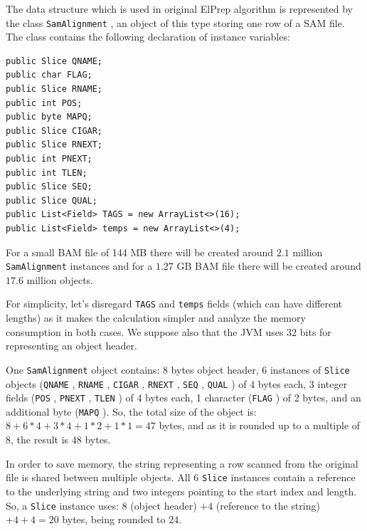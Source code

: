 \documentclass[a4paper,twoside]{article}
\begin{document}
The data structure which is used in original ElPrep algorithm is represented by the class {\texttt{SamAlignment} }, an object of this type storing one row of a SAM file.
The class contains the following declaration of instance variables:

\begin{small}
\begin{verbatim}
public Slice QNAME;
public char FLAG;
public Slice RNAME;
public int POS;
public byte MAPQ;
public Slice CIGAR;
public Slice RNEXT;
public int PNEXT;
public int TLEN;
public Slice SEQ;
public Slice QUAL;
public List<Field> TAGS = new ArrayList<>(16);
public List<Field> temps = new ArrayList<>(4);
\end{verbatim}
\end{small}

For a small BAM file of 144 MB there will be created around $2.1$ million {\texttt{SamAlignment} } instances and for a $1.27$ GB BAM file there will be created around $17.6$ million objects.

For simplicity, let's disregard {\texttt{TAGS} } and {\texttt{temps} } fields (which can have different lengths) as it makes the calculation simpler and analyze the memory consumption in both cases.
We suppose also that the JVM uses 32 bits for representing an object header.

One {\texttt{SamAlignment} } object contains:
8 bytes object header, 6 instances of {\texttt{Slice} } objects ({\texttt{QNAME} }, {\texttt{RNAME} }, {\texttt{CIGAR} }, {\texttt{RNEXT} }, {\texttt{SEQ} }, {\texttt{QUAL} }) of 4 bytes each, 3 integer fields ({\texttt{POS} }, {\texttt{PNEXT} }, {\texttt{TLEN} }) of 4 bytes each, 1 character ({\texttt{FLAG} }) of 2 bytes, and an additional byte ({\texttt{MAPQ} }).
So, the total size of the object is: $8 + 6 * 4 + 3*4  + 1 * 2+ 1 * 1 = 47$ bytes, and as it is rounded up to a multiple of $8$, the result is $48$ bytes.

In order to save memory, the string representing a row scanned from the original file is shared between multiple objects.
All $6$ {\texttt{Slice} } instances contain a reference to the  underlying string and two integers pointing to the start index and length.
So, a {\texttt{Slice} } instance uses: $8$ (object header) $+4$ (reference to the string) $ + 4 + 4 = 20$ bytes, being rounded to $24$.
\end{document}
